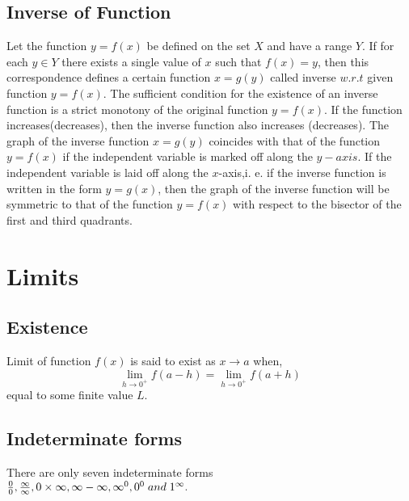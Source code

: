 \documentclass[12pt]{article}
\begin{document}
\subsection{Inverse of Function}
Let the function $y=f(x)$ be defined on the set $X$ and have a
range $Y$. If for each $y \in Y$ there exists a single value of $x$ such that $f(x) = y$, then this correspondence defines a certain function $x = g (y)$ called inverse $w.r.t$ given function $y= f(x)$. The sufficient condition for the existence of an inverse function is a strict monotony of the original function $y = f (x)$. If the function increases(decreases), then the inverse function also increases (decreases). The graph of the inverse function $x = g (y)$ coincides with that of the function $y=f(x)$ if the independent variable is marked off along the $y-axis$. If the independent variable is laid off along the $x$-axis,i. e. if the inverse function is written in the form $y = g (x)$, then the graph of the inverse function will be symmetric to that of the function $y = f (x)$ with respect to the bisector of the first and third quadrants.

\section{Limits}
\subsection{Existence}
Limit of function $f(x)$ is said to exist as $x \to a$ when,
$$\lim_{h \to 0^+} f(a-h)=\lim_{h \to 0^+} f(a+h)$$ equal to some finite value $L$.
\subsection{Indeterminate forms}
There are only seven indeterminate forms \\
$\frac{0}{0},\frac{\infty}{\infty},0 \times \infty, \infty - \infty, \infty^0, 0^0 \thickspace and \thickspace 1^{\infty}.$
\end{document}

